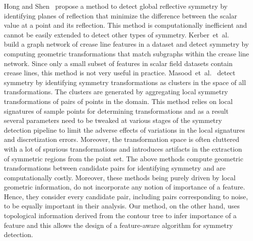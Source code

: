 \documentclass[review,journal]{vgtc}         %
\begin{document}
Hong and Shen~\cite{HongS08} propose a method to detect global reflective symmetry by identifying planes
of reflection that minimize the difference between the scalar value at a point and its
reflection. This method is computationally inefficient and cannot be easily extended to detect 
other types of symmetry. Kerber~et~al.~\cite{kerbWKS11} build a graph network of crease line features in a dataset
and detect symmetry by computing geometric transformations that match subgraphs within the crease line network.
Since only a small subset of features in scalar field datasets contain crease lines, 
this method is not very useful in practice. Masood~et~al.~\cite{MasoodTN13} detect
symmetry by identifying symmetry transformations as clusters in the space of all transformations.
The clusters are generated by aggregating local symmetry transformations of pairs of points in the 
domain. This method relies on local signatures of sample points for determining 
transformations and as a result several parameters need to be tweaked at various stages of 
the symmetry detection pipeline to limit the adverse effects of variations in the local signatures 
and discretization errors.  Moreover, the transformation space is often cluttered with a lot of 
spurious transformations and introduces artifacts in the extraction of symmetric regions from the point set. 
The above methods compute geometric transformations between candidate pairs for identifying
symmetry and are computationally costly. Moreover, these methods being purely driven by local geometric 
information, do not incorporate any notion of importance of a feature. Hence, they consider every 
candidate pair, including pairs corresponding to noise, to be equally important in their analysis. 
Our method, on the other hand, uses topological information derived from the contour tree to infer 
importance of a feature and this allows the design of a feature-aware algorithm for symmetry detection. 
\end{document}
